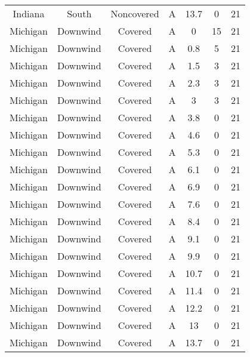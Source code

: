 \documentclass{article}
\begin{document}
\begin{longtable}[c]{ccccccc}
Indiana   & South     & Noncovered & A               & 13.7         & 0           & 21  \\
Michigan  & Downwind  & Covered     & A               & 0            & 15          & 21  \\
Michigan  & Downwind  & Covered     & A               & 0.8          & 5           & 21  \\
Michigan  & Downwind  & Covered     & A               & 1.5          & 3           & 21  \\
Michigan  & Downwind  & Covered     & A               & 2.3          & 3           & 21  \\
Michigan  & Downwind  & Covered     & A               & 3            & 3           & 21  \\
Michigan  & Downwind  & Covered     & A               & 3.8          & 0           & 21  \\
Michigan  & Downwind  & Covered     & A               & 4.6          & 0           & 21  \\
Michigan  & Downwind  & Covered     & A               & 5.3          & 0           & 21  \\
Michigan  & Downwind  & Covered     & A               & 6.1          & 0           & 21  \\
Michigan  & Downwind  & Covered     & A               & 6.9          & 0           & 21  \\
Michigan  & Downwind  & Covered     & A               & 7.6          & 0           & 21  \\
Michigan  & Downwind  & Covered     & A               & 8.4          & 0           & 21  \\
Michigan  & Downwind  & Covered     & A               & 9.1          & 0           & 21  \\
Michigan  & Downwind  & Covered     & A               & 9.9          & 0           & 21  \\
Michigan  & Downwind  & Covered     & A               & 10.7         & 0           & 21  \\
Michigan  & Downwind  & Covered     & A               & 11.4         & 0           & 21  \\
Michigan  & Downwind  & Covered     & A               & 12.2         & 0           & 21  \\
Michigan  & Downwind  & Covered     & A               & 13           & 0           & 21  \\
Michigan  & Downwind  & Covered     & A               & 13.7         & 0           & 21  \\

\end{longtable}
\end{document}
